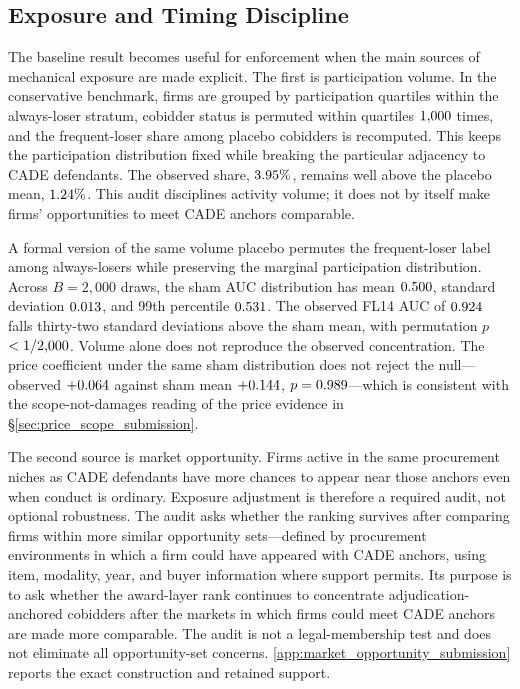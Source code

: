 \subsection{Exposure and Timing Discipline}
\label{sec:validation_exposure_timing}

The baseline result becomes useful for enforcement when the main
sources of mechanical exposure are made explicit. The first is
participation volume. In the conservative benchmark, firms are
grouped by participation quartiles within the always-loser
stratum, cobidder status is permuted within quartiles
$1{,}000$ times, and the frequent-loser share among
placebo cobidders is recomputed. This keeps the participation
distribution fixed while breaking the particular adjacency to
CADE defendants. The observed share, $3.95\%$, remains
well above the placebo mean, $1.24\%$. This audit
disciplines activity volume; it does not by itself make firms'
opportunities to meet CADE anchors comparable.

A formal version of the same volume placebo permutes the
frequent-loser label among always-losers while preserving the
marginal participation distribution. Across $B=2{,}000$ draws,
the sham AUC distribution has mean $0.500$, standard
deviation $0.013$, and 99th percentile $0.531$. The
observed FL14 AUC of $0.924$ falls thirty-two standard
deviations above the sham mean, with permutation
$p$~$<1/2{,}000$. Volume alone does not reproduce the observed
concentration. The price coefficient under the same sham
distribution does not reject the null---observed $+0.064$ against
sham mean $+0.144$, $p=0.989$---which is consistent with
the scope-not-damages reading of the price evidence in
\S\ref{sec:price_scope_submission}.

The second source is market opportunity. Firms active in the
same procurement niches as CADE defendants have more chances to
appear near those anchors even when conduct is ordinary.
Exposure adjustment is therefore a required audit, not optional
robustness. The audit asks whether the ranking survives after
comparing firms within more similar opportunity sets---defined
by procurement environments in which a firm could have appeared
with CADE anchors, using item, modality, year, and buyer
information where support permits. Its purpose is to ask whether
the award-layer rank continues to concentrate
adjudication-anchored cobidders after the markets in which firms
could meet CADE anchors are made more comparable. The audit is
not a legal-membership test and does not eliminate all
opportunity-set concerns. \ref{app:market_opportunity_submission}
reports the exact construction and retained support.


